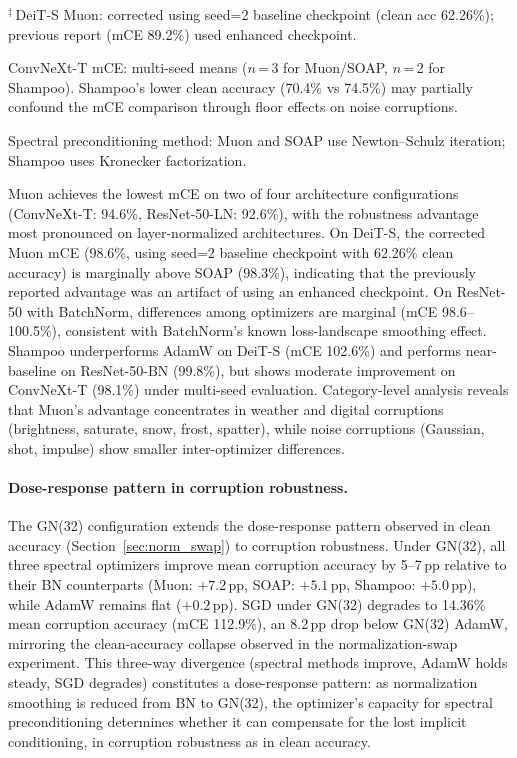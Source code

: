 \begin{table}[h]
\par\noindent\footnotesize{$^\ddagger$\,DeiT-S Muon: corrected using seed=2 baseline checkpoint (clean acc 62.26\%); previous report (mCE 89.2\%) used enhanced checkpoint.}
\par\noindent\footnotesize{ConvNeXt-T mCE: multi-seed means ($n$\,=\,3 for Muon/SOAP, $n$\,=\,2 for Shampoo). Shampoo's lower clean accuracy (70.4\% vs 74.5\%) may partially confound the mCE comparison through floor effects on noise corruptions.}
\par\noindent\footnotesize{Spectral preconditioning method: Muon and SOAP use Newton--Schulz iteration; Shampoo uses Kronecker factorization.}
\end{table}

Muon achieves the lowest mCE on two of four architecture configurations (ConvNeXt-T: 94.6\%, ResNet-50-LN: 92.6\%), with the robustness advantage most pronounced on layer-normalized architectures. On DeiT-S, the corrected Muon mCE (98.6\%, using seed=2 baseline checkpoint with 62.26\% clean accuracy) is marginally above SOAP (98.3\%), indicating that the previously reported advantage was an artifact of using an enhanced checkpoint. On ResNet-50 with BatchNorm, differences among optimizers are marginal (mCE 98.6--100.5\%), consistent with BatchNorm's known loss-landscape smoothing effect. Shampoo underperforms AdamW on DeiT-S (mCE 102.6\%) and performs near-baseline on ResNet-50-BN (99.8\%), but shows moderate improvement on ConvNeXt-T (98.1\%) under multi-seed evaluation. Category-level analysis reveals that Muon's advantage concentrates in weather and digital corruptions (brightness, saturate, snow, frost, spatter), while noise corruptions (Gaussian, shot, impulse) show smaller inter-optimizer differences.

\paragraph{Dose-response pattern in corruption robustness.}
The GN(32) configuration extends the dose-response pattern observed in clean accuracy (Section~\ref{sec:norm_swap}) to corruption robustness. Under GN(32), all three spectral optimizers improve mean corruption accuracy by 5--7\,pp relative to their BN counterparts (Muon: $+7.2$\,pp, SOAP: $+5.1$\,pp, Shampoo: $+5.0$\,pp), while AdamW remains flat ($+0.2$\,pp). SGD under GN(32) degrades to 14.36\% mean corruption accuracy (mCE 112.9\%), an 8.2\,pp drop below GN(32) AdamW, mirroring the clean-accuracy collapse observed in the normalization-swap experiment. This three-way divergence (spectral methods improve, AdamW holds steady, SGD degrades) constitutes a dose-response pattern: as normalization smoothing is reduced from BN to GN(32), the optimizer's capacity for spectral preconditioning determines whether it can compensate for the lost implicit conditioning, in corruption robustness as in clean accuracy.

